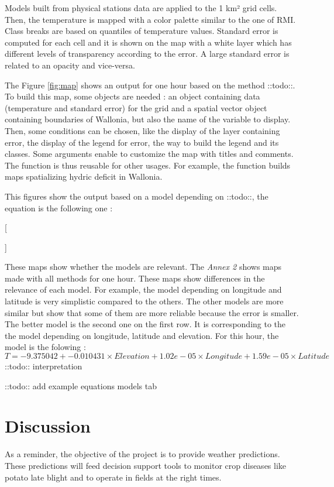 \documentclass[12pt,twoside]{reedthesis}
\theoremstyle{definition}
\theoremstyle{definition}
\theoremstyle{definition}
\theoremstyle{remark}
\begin{document}
Models built from physical stations data are applied to the 1 km² grid
cells. Then, the temperature is mapped with a color palette similar to
the one of RMI. Class breaks are based on quantiles of temperature
values. Standard error is computed for each cell and it is shown on the
map with a white layer which has different levels of transparency
according to the error. A large standard error is related to an opacity
and vice-versa.

The Figure \ref{fig:map} shows an output for one hour based on the
method ::todo::. To build this map, some objects are needed : an object
containing data (temperature and standard error) for the grid and a
spatial vector object containing boundaries of Wallonia, but also the
name of the variable to display. Then, some conditions can be chosen,
like the display of the layer containing error, the display of the
legend for error, the way to build the legend and its classes. Some
arguments enable to customize the map with titles and comments. The
function is thus reusable for other usages. For example, the function
builds maps spatializing hydric deficit in Wallonia.

This figures show the output based on a model depending on ::todo::, the
equation is the following one :

{[}

{]}

These maps show whether the models are relevant. The \emph{Annex 2}
shows maps made with all methods for one hour. These maps show
differences in the relevance of each model. For example, the model
depending on longitude and latitude is very simplistic compared to the
others. The other models are more similar but show that some of them are
more reliable because the error is smaller. The better model is the
second one on the first row. It is corresponding to the the model
depending on longitude, latitude and elevation. For this hour, the model
is the folowing : \[
T = -9.375042 + -0.010431 \times Elevation + 1.02e-05 \times Longitude + 1.59e-05 \times Latitude
\] ::todo:: interpretation

::todo:: add example equations models tab

\section{Discussion}\label{discussion}

As a reminder, the objective of the project is to provide weather
predictions. These predictions will feed decision support tools to
monitor crop diseases like potato late blight and to operate in fields
at the right times.
\end{document}
